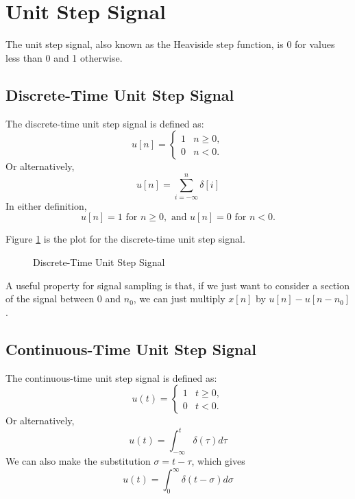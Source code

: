\section{Unit Step Signal}
The unit step signal, also known as the Heaviside step function, is
0 for values less than 0 and 1 otherwise.

\subsection{Discrete-Time Unit Step Signal}
The discrete-time unit step signal is defined as:
\[
    u[n] =
    \begin{cases}
        1 & n \geq 0, \\
        0 & n < 0.
    \end{cases}
\]
Or alternatively,
\begin{equation}
    u[n] = \sum_{i = -\infty}^{n} \delta[i]
\end{equation}
In either definition,
\[
    u[n] = 1 \text{ for } n \geq 0, \text{ and } u[n] = 0 \text{ for } n < 0.
\]

Figure \ref{fig:dt unit} is the plot for the discrete-time unit step signal.
\begin{figure}[h!]
    \centering
    \caption{Discrete-Time Unit Step Signal}
    \label{fig:dt unit}
\end{figure}

A useful property for signal sampling is that, if we
just want to consider a section of the signal between
$0$ and $n_0$, we can just multiply $x[n]$ by $u[n] - u[n - n_0]$.

\subsection{Continuous-Time Unit Step Signal}
The continuous-time unit step signal is defined as:
\[
    u(t) =
    \begin{cases}
        1 & t \geq 0, \\
        0 & t < 0.
    \end{cases}
\]
Or alternatively,
\begin{equation}
    u(t) = \int_{-\infty}^{t} \delta(\tau) d \tau
\end{equation}
We can also make the substitution $\sigma = t - \tau$, which gives
\begin{equation}
    u(t) = \int_0^{\infty} \delta(t - \sigma) d\sigma
\end{equation}

